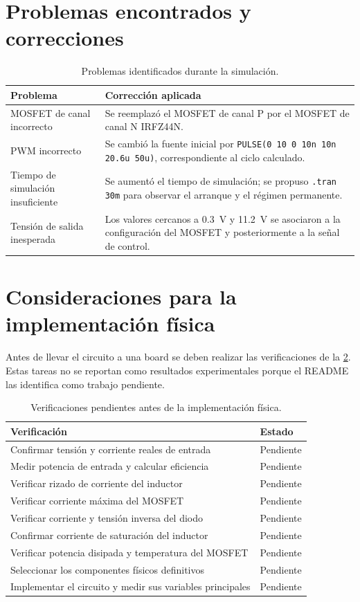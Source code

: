 \documentclass[12pt]{article}
\begin{document}
\section{Problemas encontrados y correcciones}
\begin{table}[H]
\centering
\caption{Problemas identificados durante la simulación.}
\label{tab:problemas}
\begin{tabular}{p{4.2cm}p{8.5cm}}
\toprule
\textbf{Problema} & \textbf{Corrección aplicada}\\
\midrule
MOSFET de canal incorrecto & Se reemplazó el MOSFET de canal P por el MOSFET de canal N IRFZ44N.\\
PWM incorrecto & Se cambió la fuente inicial por \texttt{PULSE(0 10 0 10n 10n 20.6u 50u)}, correspondiente al ciclo calculado.\\
Tiempo de simulación insuficiente & Se aumentó el tiempo de simulación; se propuso \texttt{.tran 30m} para observar el arranque y el régimen permanente.\\
Tensión de salida inesperada & Los valores cercanos a \SI{0.3}{V} y \SI{11.2}{V} se asociaron a la configuración del MOSFET y posteriormente a la señal de control.\\
\bottomrule
\end{tabular}
\end{table}

\section{Consideraciones para la implementación física}
Antes de llevar el circuito a una board se deben realizar las verificaciones de la \cref{tab:verificaciones}. Estas tareas no se reportan como resultados experimentales porque el README las identifica como trabajo pendiente.
\begin{table}[H]
\centering
\caption{Verificaciones pendientes antes de la implementación física.}
\label{tab:verificaciones}
\begin{tabular}{p{8.5cm}p{4.2cm}}
\toprule
\textbf{Verificación} & \textbf{Estado}\\
\midrule
Confirmar tensión y corriente reales de entrada & Pendiente\\
Medir potencia de entrada y calcular eficiencia & Pendiente\\
Verificar rizado de corriente del inductor & Pendiente\\
Verificar corriente máxima del MOSFET & Pendiente\\
Verificar corriente y tensión inversa del diodo & Pendiente\\
Confirmar corriente de saturación del inductor & Pendiente\\
Verificar potencia disipada y temperatura del MOSFET & Pendiente\\
Seleccionar los componentes físicos definitivos & Pendiente\\
Implementar el circuito y medir sus variables principales & Pendiente\\
\bottomrule
\end{tabular}
\end{table}
\end{document}
